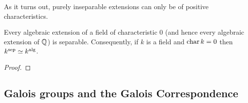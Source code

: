        \begin{definition} \label{def: separable_closures}
            
        \end{definition}
        As it turns out, purely inseparable extensions can only be of positive characteristics. 
        \begin{lemma} \label{lemma: no_purely_inseparable_extensions_over_char_0}
            Every algebraic extension of a field of characteristic $0$ (and hence every algebraic extension of $\mathbb{Q}$) is separable. Consequently, if $k$ is a field and $\operatorname{char} k = 0$ then $k^{\mathrm{sep}} \simeq k^{\mathrm{alg}}$.
        \end{lemma}
            \begin{proof}
                
            \end{proof}


    \subsection{Galois groups and the Galois Correspondence}
        \begin{definition} \label{def: normal_and_galois_extensions}
            
        \end{definition}